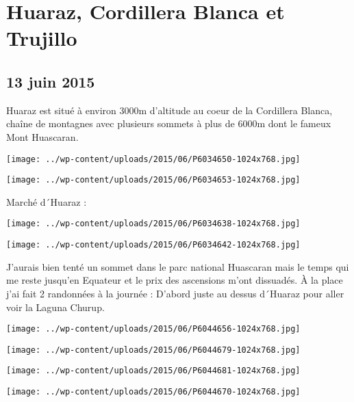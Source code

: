 \chapter{Huaraz, Cordillera Blanca et Trujillo}
\section*{13 juin 2015}
Huaraz est situé à environ 3000m d'altitude au coeur de la Cordillera Blanca, chaîne de montagnes avec plusieurs sommets à plus de 6000m dont le fameux Mont Huascaran. \newline
 \newline
\centerline{\texttt{[image: ../wp-content/uploads/2015/06/P6034650-1024x768.jpg]} } 
 \newline
 \newline
\centerline{\texttt{[image: ../wp-content/uploads/2015/06/P6034653-1024x768.jpg]} } 
 \newline
 Marché d´Huaraz : \newline
 \newline
\centerline{\texttt{[image: ../wp-content/uploads/2015/06/P6034638-1024x768.jpg]} } 
 \newline
 \newline
\centerline{\texttt{[image: ../wp-content/uploads/2015/06/P6034642-1024x768.jpg]} } 
 \newline
 J'aurais bien tenté un sommet dans le parc national Huascaran mais le temps qui me reste jusqu'en Equateur et le prix des ascensions m'ont dissuadés. \newline
 À la place j'ai fait 2 randonnées à la journée : \newline
 D'abord juste au dessus d´Huaraz pour aller voir la Laguna Churup. \newline
 \newline
\centerline{\texttt{[image: ../wp-content/uploads/2015/06/P6044656-1024x768.jpg]} } 
 \newline
 \newline
\centerline{\texttt{[image: ../wp-content/uploads/2015/06/P6044679-1024x768.jpg]} } 
 \newline
 \newline
\centerline{\texttt{[image: ../wp-content/uploads/2015/06/P6044681-1024x768.jpg]} } 
 \newline
 \newline
\centerline{\texttt{[image: ../wp-content/uploads/2015/06/P6044670-1024x768.jpg]} } 
